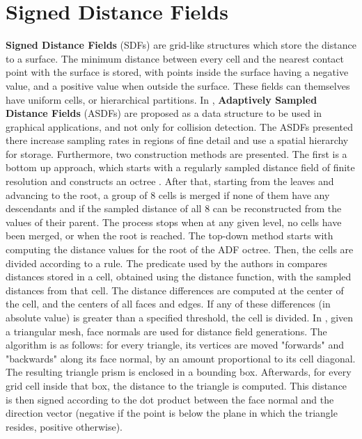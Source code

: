 \FloatBarrier
\section{Signed Distance Fields}
\label{sec:sdf}


\textbf{Signed Distance Fields} (SDFs) are grid-like structures which store the distance to a surface. The minimum distance between every cell and the nearest contact point with the surface is stored, with points inside the surface having a negative value, and a positive value when outside the surface. These fields can themselves have uniform cells, or hierarchical partitions. In \citep{fris00}, \textbf{Adaptively Sampled Distance Fields} (ASDFs) are proposed as a data structure to be used in graphical applications, and not only for collision detection. The ASDFs presented there increase sampling rates in regions of fine detail and use a spatial hierarchy for storage. Furthermore, two construction methods are presented. The first is a bottom up approach, which starts with a regularly sampled distance field of finite resolution and constructs an octree \citep{fris00}. After that, starting from the leaves and advancing to the root, a group of 8 cells is merged if none of them have any descendants and if the sampled distance of all 8 can be reconstructed from the values of their parent. The process stops when at any given level, no cells have been merged, or when the root is reached. The top-down method starts with computing the distance values for the root of the ADF octree. Then, the cells are divided according to a rule. The predicate used by the authors in \citep{fris00} compares distances stored in a cell, obtained using the distance function, with the sampled distances from that cell. The distance differences are computed at the center of the cell, and the centers of all faces and edges. If any of these differences (in absolute value) is greater than a specified threshold, the cell is divided. In \citep{fsg03}, given a triangular mesh, face normals are used for distance field generations. The algorithm is as follows: for every triangle, its vertices are moved "forwards" and "backwards" along its face normal, by an amount proportional to its cell diagonal. The resulting triangle prism is enclosed in a bounding box. Afterwards, for every grid cell inside that box, the distance to the triangle is computed. This distance is then signed according to the dot product between the face normal and the direction vector (negative if the point is below the plane in which the triangle resides, positive otherwise).


